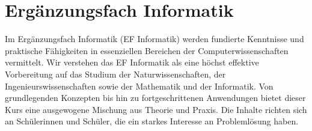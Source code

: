 


\section*{Ergänzungsfach Informatik}

Im Ergänzungsfach Informatik (EF Informatik) werden fundierte Kenntnisse und praktische Fähigkeiten in essenziellen Bereichen der Computerwissenschaften vermittelt.
Wir verstehen das EF Informatik als eine höchst effektive Vorbereitung auf das Studium der Naturwissenschaften, der Ingenieurswissenschaften sowie der Mathematik und der Informatik.
Von grundlegenden Konzepten bis hin zu fortgeschrittenen Anwendungen bietet dieser Kurs eine ausgewogene Mischung aus Theorie und Praxis. Die Inhalte richten sich an Schülerinnen und Schüler, die ein starkes Interesse an Problemlösung haben.

